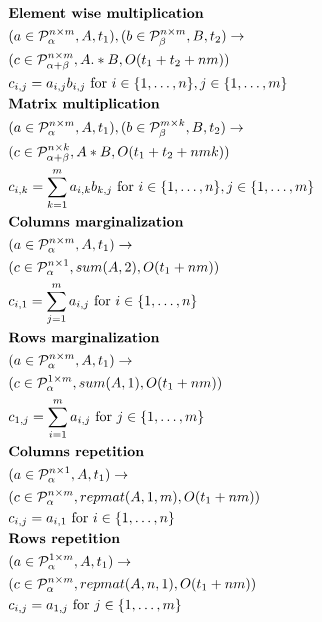 \documentclass{article}
\begin{document}
\begin{align*}
&\text{{\bf Element wise multiplication}}\\
&(a \in \mathcal{P}^{n \times m}_\alpha, A, t_1), (b \in \mathcal{P}^{n \times m}_\beta, B, t_2) \rightarrow \\ 
&(c \in \mathcal{P}^{n \times m}_{\alpha + \beta}, A .* B, O(t_1 + t_2 + nm)) \\
&c_{i,j} = a_{i,j}b_{i, j} \text{ for } i \in \{1, \dots, n\}, j \in \{1, \dots, m\} \\
&\text{{\bf Matrix multiplication}}\\
&(a \in \mathcal{P}^{n \times m}_\alpha, A, t_1), (b \in \mathcal{P}^{m \times k}_\beta, B, t_2) \rightarrow \\ 
&(c \in \mathcal{P}^{n \times k}_{\alpha + \beta}, A * B, O(t_1 + t_2 + nmk)) \\
&c_{i,k} = \sum_{k = 1}^m a_{i,k}b_{k, j} \text{ for } i \in \{1, \dots, n\}, j \in \{1, \dots, m\} \\
&\text{{\bf Columns marginalization}}\\
&(a \in \mathcal{P}^{n \times m}_\alpha, A, t_1) \rightarrow \\ 
&(c \in \mathcal{P}^{n \times 1}_\alpha, sum(A, 2), O(t_1 + nm)) \\
&c_{i, 1} = \sum_{j = 1}^m a_{i, j} \text{ for } i \in \{1, \dots, n\}\\
&\text{{\bf Rows marginalization}}\\
&(a \in \mathcal{P}^{n \times m}_\alpha, A, t_1) \rightarrow \\ 
&(c \in \mathcal{P}^{1 \times m}_\alpha, sum(A, 1), O(t_1 + nm)) \\
&c_{1, j} = \sum_{i = 1}^m a_{i, j} \text{ for } j \in \{1, \dots, m\}\\
&\text{{\bf Columns repetition}}\\
&(a \in \mathcal{P}^{n \times 1}_\alpha, A, t_1) \rightarrow \\ 
&(c \in \mathcal{P}^{n \times m}_\alpha, repmat(A, 1, m), O(t_1 + nm)) \\
&c_{i, j} = a_{i, 1} \text{ for } i \in \{1, \dots, n\}\\
&\text{{\bf Rows repetition}}\\
&(a \in \mathcal{P}^{1 \times m}_\alpha, A, t_1) \rightarrow \\ 
&(c \in \mathcal{P}^{n \times m}_\alpha, repmat(A, n, 1), O(t_1 + nm)) \\
&c_{i, j} = a_{1, j} \text{ for } j \in \{1, \dots, m\}\\

\end{align*}
\end{document}
